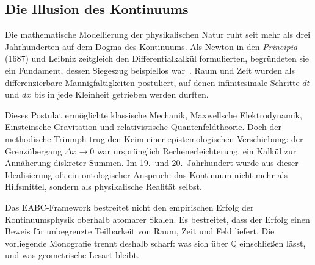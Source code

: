 \documentclass[11pt,a4paper]{article}
\theoremstyle{definition}
\theoremstyle{remark}
\numberwithin{equation}{section}
\begin{document}
\subsection{Die Illusion des Kontinuums}
Die mathematische Modellierung der physikalischen Natur ruht seit mehr als drei Jahrhunderten auf dem Dogma des Kontinuums.
Als Newton in den \emph{Principia} (1687) und Leibniz zeitgleich den Differentialkalkül formulierten, begründeten sie ein Fundament, dessen Siegeszug beispiellos war~\cite{newton1687}.
Raum und Zeit wurden als differenzierbare Mannigfaltigkeiten postuliert, auf denen infinitesimale Schritte $dt$ und $dx$ bis in jede Kleinheit getrieben werden durften.

Dieses Postulat ermöglichte klassische Mechanik, Maxwellsche Elektrodynamik, Einsteinsche Gravitation und relativistische Quantenfeldtheorie.
Doch der methodische Triumph trug den Keim einer epistemologischen Verschiebung:
der Grenzübergang $\Delta x\to 0$ war ursprünglich Rechenerleichterung, ein Kalkül zur Annäherung diskreter Summen.
Im 19.\ und 20.\ Jahrhundert wurde aus dieser Idealisierung oft ein ontologischer Anspruch:
das Kontinuum nicht mehr als Hilfsmittel, sondern als physikalische Realität selbst.

Das EABC-Framework bestreitet nicht den empirischen Erfolg der Kontinuumsphysik oberhalb atomarer Skalen.
Es bestreitet, dass der Erfolg einen Beweis für unbegrenzte Teilbarkeit von Raum, Zeit und Feld liefert.
Die vorliegende Monografie trennt deshalb scharf: was sich über $\mathbb{Q}$ einschließen lässt, und was geometrische Lesart bleibt.
\end{document}
